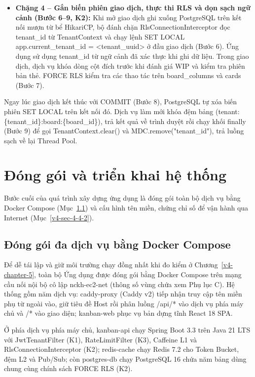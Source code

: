 \begin{itemize}
\tightlist
\item
  \textbf{Chặng 4 -- Gắn biến phiên giao dịch, thực thi RLS và dọn sạch ngữ cảnh (Bước 6--9, K2):} Khi mở giao dịch ghi xuống PostgreSQL trên kết nối mượn từ bể HikariCP, bộ đánh chặn RlsConnectionInterceptor đọc tenant\_\allowbreak{}id từ TenantContext và chạy lệnh SET LOCAL app.current\_\allowbreak{}tenant\_\allowbreak{}id = \textquotesingle\textless tenant\_\allowbreak{}uuid\textgreater\textquotesingle{} ở đầu giao dịch (Bước 6). Ứng dụng sử dụng tenant\_\allowbreak{}id từ ngữ cảnh đã xác thực khi ghi dữ liệu. Trong giao dịch, dịch vụ khóa dòng cột đích trước khi đánh giá WIP và kiểm tra phiên bản thẻ. FORCE RLS kiểm tra các thao tác trên board\_\allowbreak{}columns và cards (Bước 7).
\end{itemize}

Ngay lúc giao dịch kết thúc với COMMIT (Bước 8), PostgreSQL tự xóa biến phiên SET LOCAL trên kết nối đó. Dịch vụ làm mới khóa đệm bảng (tenant:\{tenant\_\allowbreak{}id\}:board:\{board\_\allowbreak{}id\}), trả kết quả về trình duyệt rồi chạy khối finally (Bước 9) để gọi TenantContext.clear() và MDC.remove("tenant\_\allowbreak{}id"), trả luồng sạch về lại Thread Pool.

\section{Đóng gói và triển khai hệ thống}\label{v4-sec-4-4}

Bước cuối của quá trình xây dựng ứng dụng là đóng gói toàn bộ dịch vụ bằng Docker Compose (Mục~\ref{v4-sec-4-4-1}) và cấu hình tên miền, chứng chỉ số để vận hành qua Internet (Mục~\ref{v4-sec-4-4-2}).

\subsection{Đóng gói đa dịch vụ bằng Docker Compose}\label{v4-sec-4-4-1}

Để dễ tái lập và giữ môi trường chạy đồng nhất khi đo kiểm ở Chương~\ref{v4-chapter-5}, toàn bộ Ứng dụng được đóng gói bằng Docker Compose trên mạng cầu nối nội bộ cô lập nckh-ec2-net (thông số vùng chứa xem Phụ lục C). Hệ thống gồm năm dịch vụ: caddy-proxy (Caddy v2) tiếp nhận truy cập tên miền phụ từ ngoài vào, giữ tiêu đề Host rồi phân luồng /api/* vào dịch vụ phía máy chủ và /* vào giao diện; kanban-web phục vụ bản dựng tĩnh React 18 SPA.

Ở phía dịch vụ phía máy chủ, kanban-api chạy Spring Boot 3.3 trên Java 21 LTS với JwtTenantFilter (K1), RateLimitFilter (K3), Caffeine L1 và RlsConnectionInterceptor (K2); redis-cache chạy Redis 7.2 cho Token Bucket, đệm L2 và Pub/Sub; còn postgres-db chạy PostgreSQL 16 chứa năm bảng dùng chung cùng chính sách FORCE RLS (K2).

